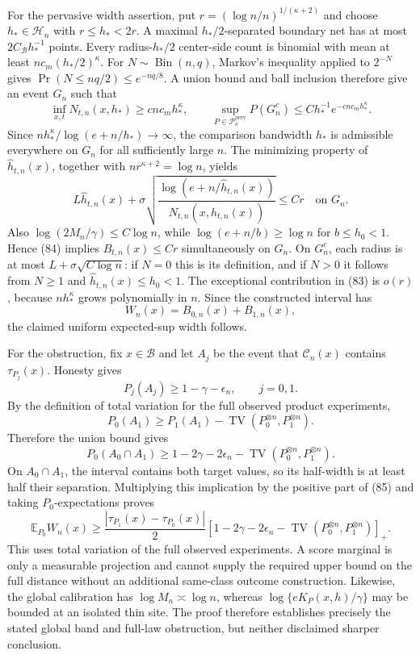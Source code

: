 For the pervasive width assertion, put \(r=(\log n/n)^{1/(\kappa+2)}\) and choose \(h_*\in\mathcal H_n\) with \(r\le h_*<2r\). A maximal \(h_*/2\)-separated boundary net has at most \(2C_{\mathcal B}h_*^{-1}\) points. Every radius-\(h_*/2\) center-side count is binomial with mean at least \(nc_m(h_*/2)^\kappa\). For \(N\sim\operatorname{Bin}(n,q)\), Markov's inequality applied to \(2^{-N}\) gives \(\Pr(N\le nq/2)\le e^{-nq/8}\). A union bound and ball inclusion therefore give an event \(G_n\) such that
\[
 \inf_{x,t}N_{t,n}(x,h_*)\ge cn c_mh_*^\kappa,
 \qquad
 \sup_{P\in\mathcal P_\kappa^{\mathrm{perv}}}P(G_n^c)
 \le Ch_*^{-1}e^{-cnc_mh_*^\kappa}. \tag{83}
\]
Since \(nh_*^\kappa/\log(e+n/h_*)\to\infty\), the comparison bandwidth \(h_*\) is admissible everywhere on \(G_n\) for all sufficiently large \(n\). The minimizing property of \(\widehat h_{t,n}(x)\), together with \(nr^{\kappa+2}=\log n\), yields
\[
 L\widehat h_{t,n}(x)+
 \sigma\sqrt{\frac{\log(e+n/\widehat h_{t,n}(x))}{N_{t,n}(x,\widehat h_{t,n}(x))}}
 \le Cr \quad\text{on }G_n. \tag{84}
\]
Also \(\log(2M_n/\gamma)\le C\log n\), while \(\log(e+n/b)\ge\log n\) for \(b\le h_0<1\). Hence (84) implies \(B_{t,n}(x)\le Cr\) simultaneously on \(G_n\). On \(G_n^c\), each radius is at most \(L+\sigma\sqrt{C\log n}\): if \(N=0\) this is its definition, and if \(N>0\) it follows from \(N\ge1\) and \(\widehat h_{t,n}(x)\le h_0<1\). The exceptional contribution in (83) is \(o(r)\), because \(nh_*^\kappa\) grows polynomially in \(n\). Since the constructed interval has
\[
 W_n(x)=B_{0,n}(x)+B_{1,n}(x),
\]
the claimed uniform expected-sup width follows.

For the obstruction, fix \(x\in\mathcal B\) and let \(A_j\) be the event that \(\mathcal C_n(x)\) contains \(\tau_{P_j}(x)\). Honesty gives
\[
 P_j(A_j)\ge1-\gamma-\epsilon_n,
 \qquad j=0,1.
\]
By the definition of total variation for the full observed product experiments,
\[
 P_0(A_1)\ge P_1(A_1)-\operatorname{TV}(P_0^{\otimes n},P_1^{\otimes n}).
\]
Therefore the union bound gives
\[
 P_0(A_0\cap A_1)
 \ge1-2\gamma-2\epsilon_n-
 \operatorname{TV}(P_0^{\otimes n},P_1^{\otimes n}). \tag{85}
\]
On \(A_0\cap A_1\), the interval contains both target values, so its half-width is at least half their separation. Multiplying this implication by the positive part of (85) and taking \(P_0\)-expectations proves
\[
 \mathbb E_{P_0}W_n(x)\ge\frac{|\tau_{P_1}(x)-\tau_{P_0}(x)|}{2}
 \left[1-2\gamma-2\epsilon_n-
 \operatorname{TV}(P_0^{\otimes n},P_1^{\otimes n})\right]_+.
\]
This uses total variation of the full observed experiments. A score marginal is only a measurable projection and cannot supply the required upper bound on the full distance without an additional same-class outcome construction. Likewise, the global calibration has \(\log M_n\asymp\log n\), whereas \(\log\{eK_P(x,h)/\gamma\}\) may be bounded at an isolated thin site. The proof therefore establishes precisely the stated global band and full-law obstruction, but neither disclaimed sharper conclusion.